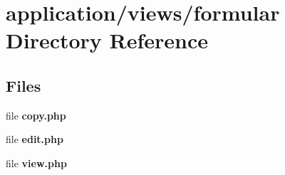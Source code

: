 \section{application/views/formular Directory Reference}
\label{dir_8269185a6becb78a9cab3bd22f2738e5}
\subsection*{Files}
\begin{DoxyCompactItemize}
\item 
file {\bf copy.\-php}
\item 
file {\bf edit.\-php}
\item 
file {\bf view.\-php}
\end{DoxyCompactItemize}
